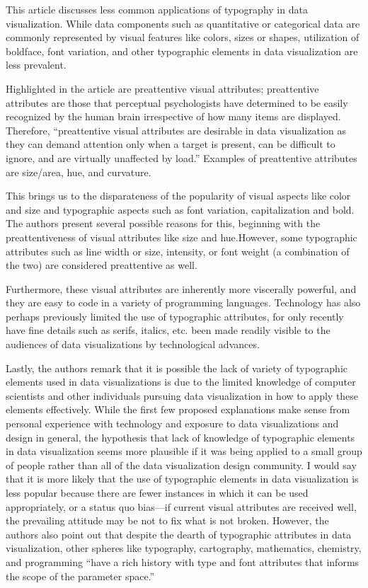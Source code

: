 \documentclass[]{book}
\theoremstyle{definition}
\theoremstyle{definition}
\theoremstyle{definition}
\theoremstyle{remark}
\begin{document}
This article discusses less common applications of typography in data
visualization. While data components such as quantitative or categorical
data are commonly represented by visual features like colors, sizes or
shapes, utilization of boldface, font variation, and other typographic
elements in data visualization are less prevalent.

Highlighted in the article are preattentive visual attributes;
preattentive attributes are those that perceptual psychologists have
determined to be easily recognized by the human brain irrespective of
how many items are displayed. Therefore, ``preattentive visual
attributes are desirable in data visualization as they can demand
attention only when a target is present, can be difficult to ignore, and
are virtually unaffected by load.'' Examples of preattentive attributes
are size/area, hue, and curvature.

This brings us to the disparateness of the popularity of visual aspects
like color and size and typographic aspects such as font variation,
capitalization and bold. The authors present several possible reasons
for this, beginning with the preattentiveness of visual attributes like
size and hue.However, some typographic attributes such as line width or
size, intensity, or font weight (a combination of the two) are
considered preattentive as well.

Furthermore, these visual attributes are inherently more viscerally
powerful, and they are easy to code in a variety of programming
languages. Technology has also perhaps previously limited the use of
typographic attributes, for only recently have fine details such as
serifs, italics, etc. been made readily visible to the audiences of data
visualizations by technological advances.

Lastly, the authors remark that it is possible the lack of variety of
typographic elements used in data visualizations is due to the limited
knowledge of computer scientists and other individuals pursuing data
visualization in how to apply these elements effectively. While the
first few proposed explanations make sense from personal experience with
technology and exposure to data visualizations and design in general,
the hypothesis that lack of knowledge of typographic elements in data
visualization seems more plausible if it was being applied to a small
group of people rather than all of the data visualization design
community. I would say that it is more likely that the use of
typographic elements in data visualization is less popular because there
are fewer instances in which it can be used appropriately, or a status
quo bias---if current visual attributes are received well, the
prevailing attitude may be not to fix what is not broken. However, the
authors also point out that despite the dearth of typographic attributes
in data visualization, other spheres like typography, cartography,
mathematics, chemistry, and programming ``have a rich history with type
and font attributes that informs the scope of the parameter space.''
\end{document}
